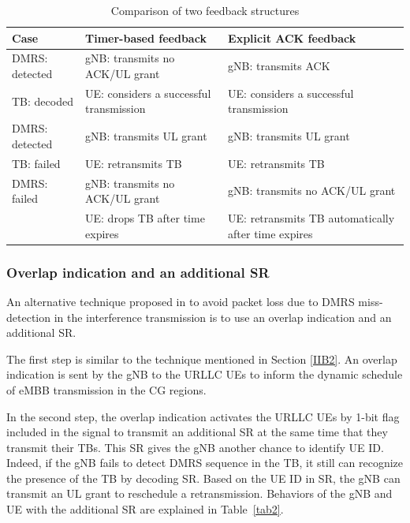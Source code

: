 \documentclass{ieeeaccess}
\begin{document}
\begin{table}[htbp]
\caption{Comparison of two feedback structures}
\begin{center}
\begin{tabular}{|p{8em}|p{8em}|p{8em}|}
 \hline
 \textbf{Case} & \textbf{Timer-based feedback}&\textbf{Explicit ACK feedback}\\
 \hline
 DMRS: detected&gNB: transmits no ACK/UL grant&gNB: transmits ACK\\TB: decoded &UE: considers a successful transmission &UE: considers a successful transmission\\
 \hline
  DMRS: detected&gNB: transmits UL grant &gNB: transmits UL grant\\TB: failed & UE: retransmits TB&UE: retransmits TB\\
 \hline
DMRS: failed&gNB: transmits no ACK/UL grant&gNB: transmits no ACK/UL grant\\ &UE: drops TB after time expires& UE: retransmits TB automatically after time expires\\

 
 \hline
\end{tabular}
\label{tab1}
\end{center}
\vspace{-5mm}
\end{table}


\subsubsection{Overlap indication and an additional SR}\label{IIB3}


An alternative technique proposed in \cite{ad99} to avoid packet loss due to DMRS miss-detection in the interference transmission is to use an overlap indication and an additional SR.

The first step is similar to the technique mentioned in Section \ref{IIB2}. An overlap indication is sent by the gNB to the URLLC UEs to inform the dynamic schedule of eMBB transmission in the CG regions.

In the second step, the overlap indication activates the URLLC UEs by 1-bit flag included in the signal to transmit an additional SR at the same time that they transmit their TBs. This SR gives the gNB another chance to identify UE ID. Indeed, if the gNB fails to detect DMRS sequence in the TB, it still can recognize the presence of the TB by decoding SR. Based on the UE ID in SR, the gNB can transmit an UL grant to reschedule a retransmission. Behaviors of the gNB and UE with the additional SR are explained in Table~\ref{tab2}.
\end{document}
